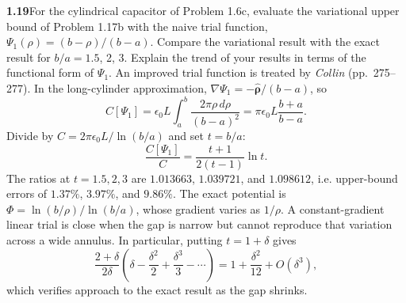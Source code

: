 \par\bigskip
\noindent\textbf{1.19}\quad For the cylindrical capacitor of Problem 1.6c, evaluate the variational upper bound of Problem 1.17b with the naive trial function, $\Psi_{1}(\rho)=(b-\rho)/(b-a)$. Compare the variational result with the exact result for $b/a=1.5$, 2, 3. Explain the trend of your results in terms of the functional form of $\Psi_{1}$. An improved trial function is treated by \emph{Collin} (pp.~275--277).
\solution
In the long-cylinder approximation,
$\nabla\Psi_1=-\widehat{\boldsymbol\rho}/(b-a)$, so
\[
C[\Psi_1]=\epsilon_0L\int_a^b\frac{2\pi\rho\,d\rho}{(b-a)^2}
=\pi\epsilon_0L\frac{b+a}{b-a}.
\]
Divide by $C=2\pi\epsilon_0L/\ln(b/a)$ and set $t=b/a$:
\[
\boxed{\frac{C[\Psi_1]}C=\frac{t+1}{2(t-1)}\ln t.}
\]
The ratios at $t=1.5,2,3$ are $1.013663$, $1.039721$, and $1.098612$,
i.e. upper-bound errors of $1.37\%$, $3.97\%$, and $9.86\%$.
The exact potential is $\Phi=\ln(b/\rho)/\ln(b/a)$, whose gradient varies
as $1/\rho$. A constant-gradient linear trial is close when the gap is narrow
but cannot reproduce that variation across a wide annulus. In particular,
putting $t=1+\delta$ gives
\[
\frac{2+\delta}{2\delta}
\left(\delta-\frac{\delta^2}{2}+\frac{\delta^3}{3}-\cdots\right)
=1+\frac{\delta^2}{12}+O(\delta^3),
\]
which verifies approach to the exact result as the gap shrinks.



